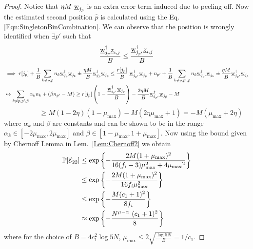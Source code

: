 \begin{proof}
Notice that $\eta M ~ \underline{\mathrm{w}}_{j_{\tilde{p}}}$ is an extra error term induced due to peeling off.
Now the estimated second position $\hat{p}$ is calculated using the Eq. \eqref{Eqn:SingletonBinCombination}. We can observe that the position is wrongly identified when $\exists p'$ such that
\[ \frac{\underline{\mathrm{w}}_{j_p}^{\dagger}\underline{z}_{i,j}}{B} \leq \frac{\underline{\mathrm{w}}_{j_{p'}}^{\dagger}\underline{z}_{i,j}}{B}\]
\begin{align*}
 &\implies r[j_p] + \frac{1}{B}\sum_{k \neq p, \tilde{p}} n_k 	\underline{\mathrm{w}}_{j_p}^{\dagger}\underline{\mathrm{w}}_{j_k} \pm \frac{\eta M}{B} \underline{\mathrm{w}}_{j_p}^{\dagger}\underline{\mathrm{w}}_{j_{\tilde{p}}}  \leq \frac{r[j_p]}{B} ~ \underline{\mathrm{w}}_{j_{p'}}^{\dagger}\underline{\mathrm{w}}_{j_p}+ n_{p'}+\frac{1}{B}\sum_{k \neq p,p',\tilde{p}}n_k\underline{\mathrm{w}}_{j_{p'}}^{\dagger} \underline{\mathrm{w}}_{j_k} \pm \frac{\eta M}{B} \underline{\mathrm{w}}_{j_{p'}}^{\dagger}\underline{\mathrm{w}}_{j_{\tilde{p}}}\\
&\leftrightarrow \sum_{k \neq p,p',\tilde{p}}\alpha_k n_k+ (\beta n_{p'} - M) \geq  r[j_p]\left(1-\frac{\underline{\mathrm{w}}_{j_{p'}}^{\dagger}\underline{\mathrm{w}}_{j_p}}{B}\right) - \frac{2 \eta M}{B} \underline{\mathrm{w}}_{j_{p'}}^{\dagger}\underline{\mathrm{w}}_{j_{\tilde{p}}} - M
\end{align*}
\[~~~~~~~~~~~~~~~~~~~\geq M(1-2\eta)(1-\mu_{\text{max}}) - M (2\eta \mu_{\text{max}} + 1) = -M(\mu_{\text{max}}+2\eta)                           
\]
where $\alpha_k$ and $\beta$ are constants and can be shown to be in the range $\alpha_k\in[-2\mu_\text{max},2\mu_\text{max}]$ and $\beta\in[1-\mu_\text{max},1+\mu_\text{max}]$. Now using the bound given by Chernoff Lemma in Lem.~\ref{Lem:Chernoff2} we obtain
\begin{align*}
\mathbb{P}[\mathcal{E}_{22}]&\leq \exp\left\lbrace-\frac{2M(1+\mu_{\text{max}})^2}{16(f_i-3)\mu^2_{\max}+4{\mu_{\max}}^2}\right\rbrace\\
&\leq\exp\left\lbrace-\frac{2M(1+\mu_{\text{max}})^2}{16 f_i \mu^2_{\max}}\right\rbrace\\
&\leq\exp\left\lbrace-\frac{M(c_1+1)^2}{8 f_i}\right\rbrace\\
&\approx\exp\left\lbrace-\frac{N^{\mu - \alpha }~(c_1+1)^2}{8}\right\rbrace\\
\end{align*}
where for the choice of $B=4c_1^2\log 5N$, $\mu_{\max}\leq 2\sqrt{\frac{\log 5N}{B}} = 1/c_1$.

\end{proof}

